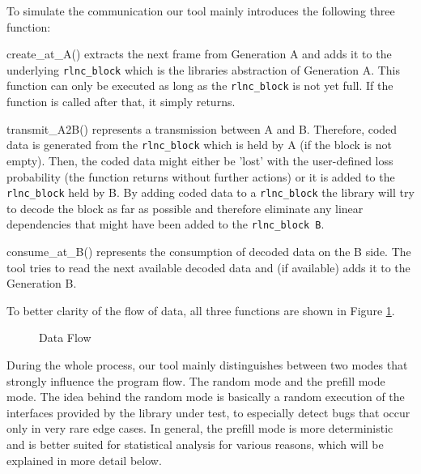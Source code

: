 \documentclass[a4paper,english,10pt]{tumarticle}
\begin{document}
To simulate the communication our tool mainly introduces the following three function:

create\_at\_A() extracts the next frame from Generation A and adds it to the underlying \texttt{rlnc\_block}
which is the libraries abstraction of Generation A. 
This function can only be executed as long as the \texttt{rlnc\_block} is not yet full. 
If the function is called after that, it simply returns.

transmit\_A2B() represents a transmission between A and B. Therefore, coded data is generated from the 
\texttt{rlnc\_block} which is held by A (if the block is not empty). Then, the coded data might either be 'lost' 
with the user-defined loss probability (the function returns without further actions)
or it is added to the \texttt{rlnc\_block} held by B. By adding coded data to a \texttt{rlnc\_block} the library will try to decode the block as far as possible
and therefore eliminate any linear dependencies that might have been added to the \texttt{rlnc\_block B}.

consume\_at\_B() represents the consumption of decoded data on the B side. 
The tool tries to read the next available decoded data and (if available) adds it to the Generation B.

To better clarity of the flow of data, all three functions are shown in Figure \ref{fig:func}.

\begin{figure}[h]
  \center
  \caption{Data Flow}
  \label{fig:func}
\end{figure}

During the whole process, our tool mainly distinguishes between two modes that strongly influence the program flow. 
The random mode and the prefill mode mode. 
The idea behind the random mode is basically a random execution of the interfaces provided by the library under test, 
to especially detect bugs that occur only in very rare edge cases.
In general, the prefill mode is more deterministic and is better suited for 
statistical analysis for various reasons, which will be explained in more detail below.
\end{document}
